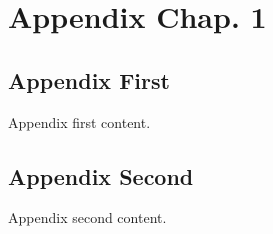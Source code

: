 \newpage
{}

\chapter{Appendix Chap. 1}
\label{appendix:chap1}

\section{Appendix First}
Appendix first content.

\section{Appendix Second}
Appendix second content.

